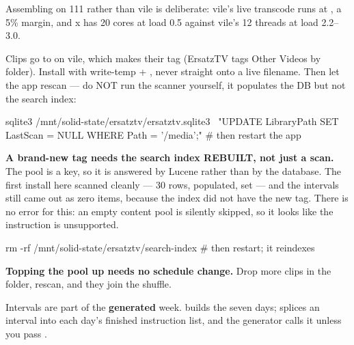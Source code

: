 \documentclass[fontpath=fonts/,logopath=logo/]{riposte-doc}
\begin{document}
Assembling on 111 rather than vile is deliberate: vile's live transcode runs at , a 5\% margin, and x has 20 cores at load 0.5 against vile's 12 threads at load 2.2–3.0.



Clips go to  on vile, which makes their tag  (ErsatzTV tags Other Videos by folder). Install with write-temp + , never straight onto a live filename. Then let the app rescan — do NOT run the scanner yourself, it populates the DB but not the search index:

\ripcodeopen
{}
\begin{ripcodeblock}
sqlite3 /mnt/solid-state/ersatztv/ersatztv.sqlite3 \
  "UPDATE LibraryPath SET LastScan = NULL WHERE Path = '/media';"
# then restart the app
\end{ripcodeblock}
\ripcodesizereset\ripcodeclose

\textbf{A brand-new tag needs the search index REBUILT, not just a scan.} The pool is a  key, so it is answered by Lucene rather than by the database. The first install here scanned cleanly — 30 rows,  populated,  set — and the intervals still came out as zero items, because the index did not have the new  tag. There is no error for this: an empty content pool is silently skipped, so it looks like the  instruction is unsupported.

\ripcodeopen
{}
\begin{ripcodeblock}
rm -rf /mnt/solid-state/ersatztv/search-index   # then restart; it reindexes
\end{ripcodeblock}
\ripcodesizereset\ripcodeclose

\textbf{Topping the pool up needs no schedule change.} Drop more clips in the folder, rescan, and they join the shuffle.



Intervals are part of the \textbf{generated} week.  builds the seven days;  splices an interval into each day's finished instruction list, and the generator calls it unless you pass .
\end{document}
